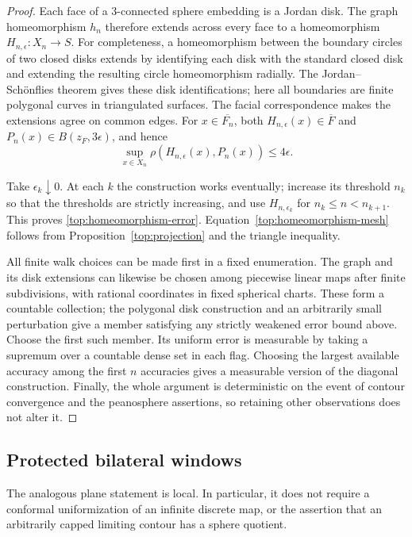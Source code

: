 \documentclass[11pt]{article}
\numberwithin{equation}{section}
\theoremstyle{definition}
\theoremstyle{remark}
\newcommand{\1}{\mathbf 1}
\begin{document}
\begin{proof}
Each face of a $3$-connected sphere embedding is a Jordan disk.
The graph homeomorphism $h_n$ therefore extends across every face
to a homeomorphism $H_{n,\epsilon}:X_n\to S$.
For completeness, a homeomorphism between the boundary circles of
two closed disks extends by identifying each disk with the standard
closed disk and extending the resulting circle homeomorphism
radially.  The Jordan--Sch\"onflies theorem gives these disk
identifications; here all boundaries are finite polygonal curves
in triangulated surfaces.  The facial correspondence makes the
extensions agree on common edges.  For $x\in\overline{F_n}$,
both $H_{n,\epsilon}(x)\in\overline F$ and
$P_n(x)\in B(z_F,3\epsilon)$, and hence
\[
 \sup_{x\in X_n}\rho(H_{n,\epsilon}(x),P_n(x))
 \le 4\epsilon.
\]

Take $\epsilon_k\downarrow0$.  At each $k$ the construction works
eventually; increase its threshold $n_k$ so that the thresholds are
strictly increasing, and use $H_{n,\epsilon_k}$ for
$n_k\le n<n_{k+1}$.  This proves
\eqref{top:homeomorphism-error}.  Equation~\eqref{top:homeomorphism-mesh}
follows from Proposition~\ref{top:projection} and the triangle
inequality.

All finite walk choices can be made first in a fixed enumeration.
The graph and its disk extensions can likewise be chosen among
piecewise linear maps after finite subdivisions, with rational
coordinates in fixed spherical charts.  These form a countable
collection; the polygonal disk construction and an arbitrarily
small perturbation give a member satisfying any strictly weakened
error bound above.  Choose the first such member.  Its uniform
error is measurable by taking a supremum over a countable dense
set in each flag.  Choosing the largest available accuracy among
the first $n$ accuracies gives a measurable version of the
diagonal construction.  Finally, the whole argument is
deterministic on the event of contour convergence and the
peanosphere assertions, so retaining other observations does not
alter it.
\end{proof}

\subsection{Protected bilateral windows}

The analogous plane statement is local.  In particular, it does not
require a conformal uniformization of an infinite discrete map, or the
assertion that an arbitrarily capped limiting contour has a sphere
quotient.
\end{document}
